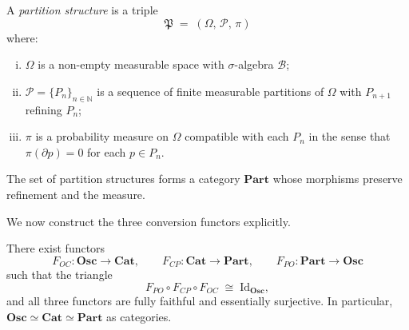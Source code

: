 \begin{definition}
\label{def:part-structure}
A \emph{partition structure} is a triple
\[
  \mathfrak{P} \;=\; (\Omega,\, \mathscr{P},\, \pi)
\]
where:
\begin{enumerate}[(i)]
  \item $\Omega$ is a non-empty measurable space with $\sigma$-algebra
    $\mathscr{B}$;
  \item $\mathscr{P} = \{P_n\}_{n \in \mathbb{N}}$ is a sequence of finite
    measurable partitions of $\Omega$ with $P_{n+1}$ refining $P_n$;
  \item $\pi$ is a probability measure on $\Omega$ compatible with each
    $P_n$ in the sense that $\pi(\partial p) = 0$ for each $p \in P_n$.
\end{enumerate}
The set of partition structures forms a category $\mathbf{Part}$ whose
morphisms preserve refinement and the measure.
\end{definition}

We now construct the three conversion functors explicitly.

\begin{theorem}
\label{thm:triple-equivalence}
There exist functors
\[
  F_{OC} : \mathbf{Osc} \to \mathbf{Cat}, \qquad
  F_{CP} : \mathbf{Cat} \to \mathbf{Part}, \qquad
  F_{PO} : \mathbf{Part} \to \mathbf{Osc}
\]
such that the triangle
\[
  F_{PO} \circ F_{CP} \circ F_{OC} \;\cong\; \mathrm{Id}_{\mathbf{Osc}},
\]
and all three functors are fully faithful and essentially surjective.  In
particular, $\mathbf{Osc} \simeq \mathbf{Cat} \simeq \mathbf{Part}$ as
categories.
\end{theorem}

